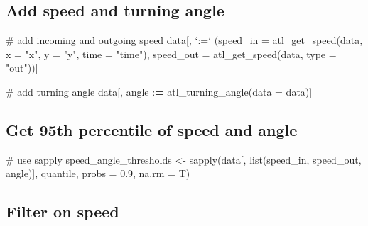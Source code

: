 \documentclass[]{scrreprt}
\newenvironment{Shaded}{}{}
\newcommand{\CommentTok}[1]{\textcolor[rgb]{0.00,0.50,0.00}{#1}}
\newcommand{\DataTypeTok}[1]{#1}
\newcommand{\ErrorTok}[1]{\textcolor[rgb]{1.00,0.00,0.00}{\textbf{#1}}}
\newcommand{\FloatTok}[1]{#1}
\newcommand{\KeywordTok}[1]{\textcolor[rgb]{0.00,0.00,1.00}{#1}}
\newcommand{\NormalTok}[1]{#1}
\newcommand{\OperatorTok}[1]{#1}
\newcommand{\StringTok}[1]{\textcolor[rgb]{0.00,0.50,0.50}{#1}}
\begin{document}
\hypertarget{add-speed-and-turning-angle}{%
\subsection{Add speed and turning angle}\label{add-speed-and-turning-angle}}

\begin{Shaded}
\begin{Highlighting}[]
\CommentTok{# add incoming and outgoing speed}
\NormalTok{data[, }\StringTok{`}\DataTypeTok{:=}\StringTok{`}\NormalTok{ (}\DataTypeTok{speed_in =} \KeywordTok{atl_get_speed}\NormalTok{(data, }
                                      \DataTypeTok{x =} \StringTok{"x"}\NormalTok{, }
                                      \DataTypeTok{y =} \StringTok{"y"}\NormalTok{, }
                                      \DataTypeTok{time =} \StringTok{"time"}\NormalTok{),}
             \DataTypeTok{speed_out =} \KeywordTok{atl_get_speed}\NormalTok{(data, }\DataTypeTok{type =} \StringTok{"out"}\NormalTok{))]}

\CommentTok{# add turning angle}
\NormalTok{data[, angle }\OperatorTok{:}\ErrorTok{=}\StringTok{ }\KeywordTok{atl_turning_angle}\NormalTok{(}\DataTypeTok{data =}\NormalTok{ data)]}
\end{Highlighting}
\end{Shaded}

\hypertarget{get-95th-percentile-of-speed-and-angle}{%
\subsection{Get 95th percentile of speed and angle}\label{get-95th-percentile-of-speed-and-angle}}

\begin{Shaded}
\begin{Highlighting}[]
\CommentTok{# use sapply}
\NormalTok{speed_angle_thresholds <-}\StringTok{ }
\StringTok{  }\KeywordTok{sapply}\NormalTok{(data[, }\KeywordTok{list}\NormalTok{(speed_in, speed_out, angle)], }
\NormalTok{       quantile, }\DataTypeTok{probs =} \FloatTok{0.9}\NormalTok{, }\DataTypeTok{na.rm =}\NormalTok{ T)}
\end{Highlighting}
\end{Shaded}

\hypertarget{filter-on-speed}{%
\subsection{Filter on speed}\label{filter-on-speed}}
\end{document}
